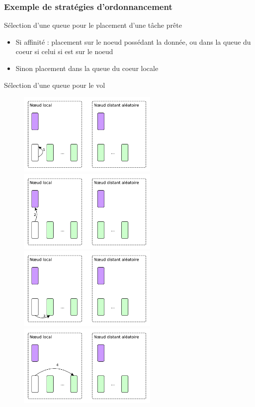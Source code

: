 \documentclass[xcolor={usenames,dvipsnames,svgnames,table}, aspectratio=43]{beamer}
\begin{document}
\begin{frame}
\frametitle{Exemple de stratégies d'ordonnancement}

\vspace{0.3cm}
Sélection d'une queue pour le placement d'une tâche prête
\begin{itemize}
  \item Si affinité : placement sur le noeud possédant la donnée, ou dans la queue du coeur si celui si est sur le noeud
  \item Sinon placement dans la queue du coeur locale
\end{itemize}
\vspace{0.5cm}

Sélection d'une queue pour le vol
\begin{figure}
   {%
    \includegraphics[width=0.6\textwidth]{graph/steal_strategies_anim_1.pdf}%
  }%
   {%
    \includegraphics[width=0.6\textwidth]{graph/steal_strategies_anim_2.pdf}%
  }%
   {%
    \includegraphics[width=0.6\textwidth]{graph/steal_strategies_anim_3.pdf}%
  }%
   {%
    \includegraphics[width=0.6\textwidth]{graph/steal_strategies_anim_4.pdf}%
}
\end{figure}
\end{frame}
\end{document}
